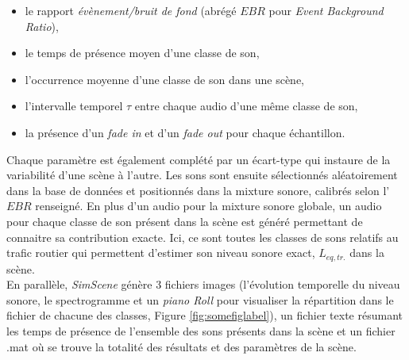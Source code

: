 \begin{itemize}
\item le rapport \textit{évènement/bruit de fond} (abrégé $EBR$ pour \textit{Event Background Ratio}),
\item le temps de présence moyen d'une classe de son,
\item l'occurrence moyenne d'une classe de son dans une scène,
\item l'intervalle temporel $\tau$ entre chaque audio d'une même classe de son,
\item la présence d'un \textit{fade in} et d'un \textit{fade out} pour chaque échantillon.\\
\end{itemize}

Chaque paramètre est également complété par un écart-type qui instaure de la variabilité d'une scène à l'autre. Les sons sont ensuite sélectionnés aléatoirement dans la base de données et positionnés dans la mixture sonore, calibrés selon l'$EBR$ renseigné. En plus d'un audio pour la mixture sonore globale, un audio pour chaque classe de son présent dans la scène est généré permettant de connaitre sa contribution exacte. Ici, ce sont toutes les classes de sons relatifs au trafic routier qui permettent d'estimer son niveau sonore exact, $L_{eq,tr.}$ dans la scène.\\

En parallèle, \textit{SimScene} génère 3 fichiers images (l'évolution temporelle du niveau sonore, le spectrogramme et un \textit{piano Roll} pour visualiser la répartition dans le fichier de chacune des classes, Figure \ref{fig:somefiglabel}), un fichier texte résumant les temps de présence de l'ensemble des sons présents dans la scène et un fichier .mat où se trouve la totalité des résultats et des paramètres de la scène.\\


